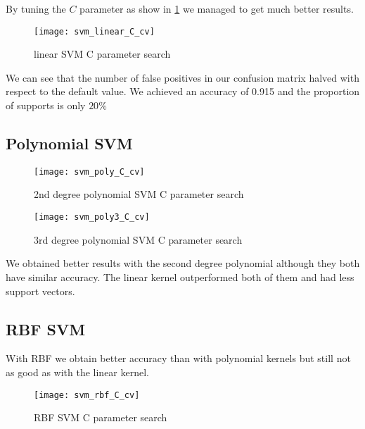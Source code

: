 
By tuning the $C$ parameter as show in \cref{fig:svm_linear_C_cv} we managed to get much better results.

\begin{figure}[H]
    \centering
    \texttt{[image: svm\_linear\_C\_cv]}
    \caption{linear SVM C parameter search}%
    \label{fig:svm_linear_C_cv}
\end{figure}




We can see that the number of false positives in our confusion matrix halved with respect to the
default value. We achieved an accuracy of 0.915 and the proportion of supports is only $20\%$

\subsection{Polynomial SVM}


\begin{figure}[H]
    \centering
    \texttt{[image: svm\_poly\_C\_cv]}
    \caption{2nd degree polynomial SVM C parameter search}%
    \label{fig:svm_poly_C_cv}
\end{figure}


\begin{figure}[H]
    \centering
    \texttt{[image: svm\_poly3\_C\_cv]}
    \caption{3rd degree polynomial SVM C parameter search}%
    \label{fig:svm_poly3_C_cv}
\end{figure}

We obtained better results with the second degree polynomial although they both have similar accuracy. The linear
kernel outperformed both of them and had less support vectors.

\pagebreak
\subsection{RBF SVM}

With RBF we obtain better accuracy than with polynomial kernels but still not as good as with the linear kernel.


\begin{figure}[H]
    \centering
    \texttt{[image: svm\_rbf\_C\_cv]}
    \caption{RBF SVM C parameter search}%
    \label{fig:svm_rbf_C_cv}
\end{figure}
